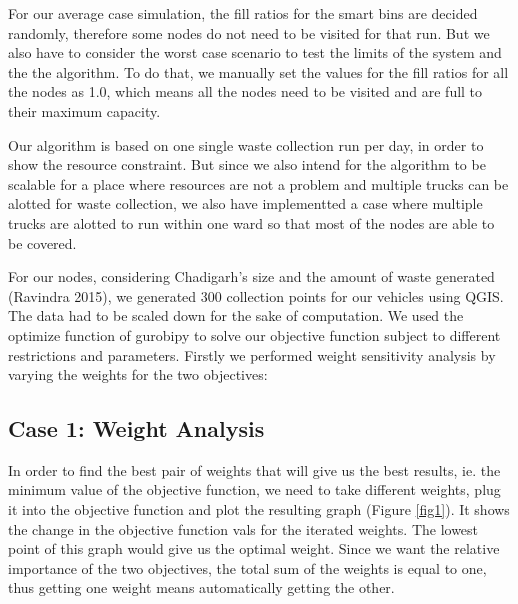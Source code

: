 \documentclass[12pt]{article}
\begin{document}
For our average case simulation, the fill ratios for the smart bins are decided randomly, therefore some nodes do not need to be visited for that run. But we also have to consider the worst case scenario to test the limits of the system and the the algorithm. To do that, we manually set the values for the fill ratios for all the nodes as 1.0, which means all the nodes need to be visited and are full to their maximum capacity.

Our algorithm is based on one single waste collection run per day, in order to show the resource constraint. But since we also intend for the algorithm to be scalable for a place where resources are not a problem and multiple trucks can be alotted for waste collection, we also have implementted a case where multiple trucks are alotted to run within one ward so that most of the nodes are able to be covered.

For our nodes, considering Chadigarh's size and the amount of waste generated (Ravindra 2015), we generated 300 collection points for our vehicles using QGIS. The data had to be scaled down for the sake of computation. We used the optimize function of gurobipy to solve our objective function subject to different restrictions and parameters. Firstly we performed weight sensitivity analysis by varying the weights for the two objectives:

\subsection*{Case 1: Weight Analysis}
In order to find the best pair of weights that will give us the best results, ie. the minimum value of the objective function, we need to take different weights, plug it into the objective function and plot the resulting graph (Figure \ref{fig1}). It shows the change in the objective function vals for the iterated weights. The lowest point of this graph would give us the optimal weight. Since we want the relative importance of the two objectives, the total sum of the weights is equal to one, thus getting one weight means automatically getting the other.
\end{document}
